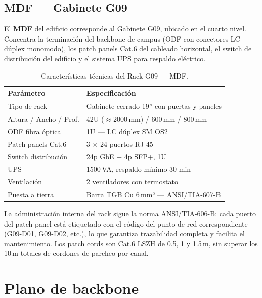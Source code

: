 \subsection{MDF — Gabinete G09}

El \textbf{MDF} del edificio corresponde al Gabinete G09, ubicado en el cuarto
nivel. Concentra la terminación del backbone de campus (ODF con conectores
LC dúplex monomodo), los patch panels Cat.6 del cableado horizontal, el switch
de distribución del edificio y el sistema UPS para respaldo eléctrico.

\begin{table}[H]
    \centering
    \caption{Características técnicas del Rack G09 — MDF.}
    \label{tab:rack_g09}
    \begin{tabular}{|p{5.5cm}|p{8cm}|}
        \hline
        \textbf{Parámetro} & \textbf{Especificación} \\
        \hline
        Tipo de rack          & Gabinete cerrado 19'' con puertas y paneles \\
        \hline
        Altura / Ancho / Prof.& 42U ($\approx$2000\,mm) / 600\,mm / 800\,mm \\
        \hline
        ODF fibra óptica      & 1U — LC dúplex SM OS2 \\
        \hline
        Patch panels Cat.6    & 3 $\times$ 24 puertos RJ-45 \\
        \hline
        Switch distribución   & 24p GbE + 4p SFP+, 1U \\
        \hline
        UPS                   & 1500\,VA, respaldo mínimo 30 min \\
        \hline
        Ventilación           & 2 ventiladores con termostato \\
        \hline
        Puesta a tierra       & Barra TGB Cu 6\,mm² — \mbox{ANSI/TIA-607-B} \\
        \hline
    \end{tabular}
\end{table}

La administración interna del rack sigue la norma \mbox{ANSI/TIA-606-B}: cada
puerto del patch panel está etiquetado con el código del punto de red
correspondiente (G09-D01, G09-D02, etc.), lo que garantiza trazabilidad completa
y facilita el mantenimiento. Los patch cords son Cat.6 LSZH de 0.5, 1 y 1.5\,m,
sin superar los 10\,m totales de cordones de parcheo por canal.

\section{Plano de backbone}
\label{sec:plano_backbone}

